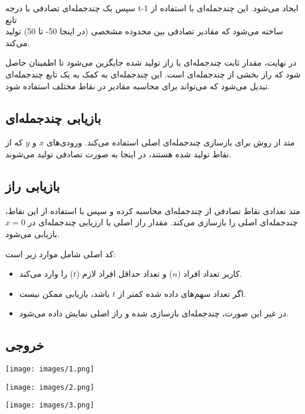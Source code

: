 سپس یک چندجمله‌ای تصادفی با درجه t-1 ایجاد می‌شود. این چندجمله‌ای با استفاده از تابع \\ ساخته می‌شود که مقادیر تصادفی بین محدوده مشخصی (در اینجا 50- تا 50) تولید می‌کند. 

در نهایت، مقدار ثابت چندجمله‌ای با راز تولید شده جایگزین می‌شود تا اطمینان حاصل شود که راز بخشی از چندجمله‌ای است. این چندجمله‌ای به کمک  به یک تابع چندجمله‌ای تبدیل می‌شود که می‌تواند برای محاسبه مقادیر در نقاط مختلف استفاده شود.


\subsection*{بازیابی چندجمله‌ای}
متد  از روش  برای بازسازی چندجمله‌ای اصلی استفاده می‌کند. ورودی‌های $x$ و $y$ که از نقاط تولید شده هستند، در اینجا به صورت تصادفی تولید می‌شوند.

\subsection*{بازیابی راز}
متد  تعدادی نقاط تصادفی از چندجمله‌ای محاسبه کرده و سپس با استفاده از این نقاط، چندجمله‌ای اصلی را بازسازی می‌کند. مقدار راز اصلی با ارزیابی چندجمله‌ای در \(x = 0\) بازیابی می‌شود.


کد اصلی شامل موارد زیر است:
\begin{itemize}
    \item کاربر تعداد افراد ($n$) و تعداد حداقل افراد لازم ($t$) را وارد می‌کند.
    \item اگر تعداد سهم‌های داده شده کمتر از $t$ باشد، بازیابی ممکن نیست.
    \item در غیر این صورت، چندجمله‌ای بازسازی شده و راز اصلی نمایش داده می‌شود.
\end{itemize}


\subsection*{خروجی}

\texttt{[image: images/1.png]}

\texttt{[image: images/2.png]}

\texttt{[image: images/3.png]}

